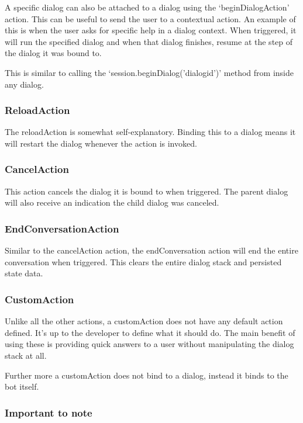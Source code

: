 A specific dialog can also be attached to a dialog using the `beginDialogAction' action. This can be useful to send the user to a contextual action. An example of this is when the user asks for specific help in a dialog context. When triggered, it will run the specified dialog and when that dialog finishes, resume at the step of the dialog it was bound to.

This is similar to calling the `session.beginDialog('dialogid')' method from inside any dialog.

\subsubsection{ReloadAction}

The reloadAction is somewhat self-explanatory. Binding this to a dialog means it will restart the dialog whenever the action is invoked.

\subsubsection{CancelAction}

This action cancels the dialog it is bound to when triggered. The parent dialog will also receive an indication the child dialog was canceled.

\subsubsection{EndConversationAction}

Similar to the cancelAction action, the endConversation action will end the entire conversation when triggered. This clears the entire dialog stack and persisted state data.

\subsubsection{CustomAction}

Unlike all the other actions, a customAction does not have any default action defined. It's up to the developer to define what it should do. The main benefit of using these is providing quick answers to a user without manipulating the dialog stack at all.

Further more a customAction does not bind to a dialog, instead it binds to the bot itself.

\subsubsection{Important to note}

